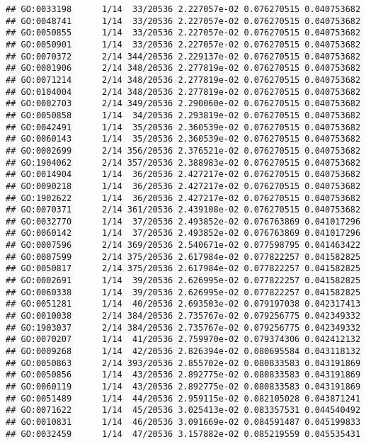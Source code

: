 \documentclass[
]{article}
\begin{document}
\begin{verbatim}
## GO:0033198      1/14  33/20536 2.227057e-02 0.076270515 0.040753682
## GO:0048741      1/14  33/20536 2.227057e-02 0.076270515 0.040753682
## GO:0050855      1/14  33/20536 2.227057e-02 0.076270515 0.040753682
## GO:0050901      1/14  33/20536 2.227057e-02 0.076270515 0.040753682
## GO:0070372      2/14 344/20536 2.229137e-02 0.076270515 0.040753682
## GO:0001906      2/14 348/20536 2.277819e-02 0.076270515 0.040753682
## GO:0071214      2/14 348/20536 2.277819e-02 0.076270515 0.040753682
## GO:0104004      2/14 348/20536 2.277819e-02 0.076270515 0.040753682
## GO:0002703      2/14 349/20536 2.290060e-02 0.076270515 0.040753682
## GO:0050858      1/14  34/20536 2.293819e-02 0.076270515 0.040753682
## GO:0042491      1/14  35/20536 2.360539e-02 0.076270515 0.040753682
## GO:0060143      1/14  35/20536 2.360539e-02 0.076270515 0.040753682
## GO:0002699      2/14 356/20536 2.376521e-02 0.076270515 0.040753682
## GO:1904062      2/14 357/20536 2.388983e-02 0.076270515 0.040753682
## GO:0014904      1/14  36/20536 2.427217e-02 0.076270515 0.040753682
## GO:0090218      1/14  36/20536 2.427217e-02 0.076270515 0.040753682
## GO:1902622      1/14  36/20536 2.427217e-02 0.076270515 0.040753682
## GO:0070371      2/14 361/20536 2.439108e-02 0.076270515 0.040753682
## GO:0032770      1/14  37/20536 2.493852e-02 0.076763869 0.041017296
## GO:0060142      1/14  37/20536 2.493852e-02 0.076763869 0.041017296
## GO:0007596      2/14 369/20536 2.540671e-02 0.077598795 0.041463422
## GO:0007599      2/14 375/20536 2.617984e-02 0.077822257 0.041582825
## GO:0050817      2/14 375/20536 2.617984e-02 0.077822257 0.041582825
## GO:0002691      1/14  39/20536 2.626995e-02 0.077822257 0.041582825
## GO:0060338      1/14  39/20536 2.626995e-02 0.077822257 0.041582825
## GO:0051281      1/14  40/20536 2.693503e-02 0.079197038 0.042317413
## GO:0010038      2/14 384/20536 2.735767e-02 0.079256775 0.042349332
## GO:1903037      2/14 384/20536 2.735767e-02 0.079256775 0.042349332
## GO:0070207      1/14  41/20536 2.759970e-02 0.079374306 0.042412132
## GO:0009268      1/14  42/20536 2.826394e-02 0.080695584 0.043118132
## GO:0050863      2/14 393/20536 2.855702e-02 0.080833583 0.043191869
## GO:0050856      1/14  43/20536 2.892775e-02 0.080833583 0.043191869
## GO:0060119      1/14  43/20536 2.892775e-02 0.080833583 0.043191869
## GO:0051489      1/14  44/20536 2.959115e-02 0.082105028 0.043871241
## GO:0071622      1/14  45/20536 3.025413e-02 0.083357531 0.044540492
## GO:0010831      1/14  46/20536 3.091669e-02 0.084591487 0.045199833
## GO:0032459      1/14  47/20536 3.157882e-02 0.085219559 0.045535431

\end{verbatim}
\end{document}
